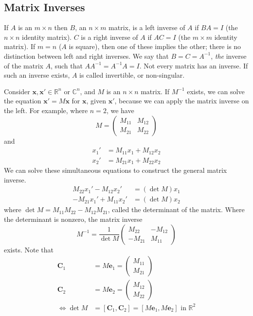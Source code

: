 \documentclass{article}
\begin{document}
\subsection{Matrix Inverses}
If $A$ is an $m \times n$ then $B$, an $n \times m$ matrix, is a left inverse of $A$ if $BA = I$ (the $n \times n$ identity matrix). $C$ is a right inverse of $A$ if $AC = I$ (the $m \times m$ identity matrix). If $m = n$ ($A$ is square), then one of these implies the other; there is no distinction between left and right inverses. We say that $B = C = A^{-1}$, \textit{the} inverse of the matrix $A$, such that $AA^{-1} = A^{-1}A = I$. Not every matrix has an inverse. If such an inverse exists, $A$ is called invertible, or non-singular.

Consider $\bm x, \bm x' \in \mathbb R^n$ or $\mathbb C^n$, and $M$ is an $n \times n$ matrix. If $M^{-1}$ exists, we can solve the equation $\bm x' = M \bm x$ for $\bm x$, given $\bm x'$, because we can apply the matrix inverse on the left. For example, where $n=2$, we have
\[ M = \begin{pmatrix}
		M_{11} & M_{12} \\
		M_{21} & M_{22}
	\end{pmatrix} \]
and
\begin{align*}
	x_1' & = M_{11}x_1 + M_{12}x_2 \\
	x_2' & = M_{21}x_1 + M_{22}x_2
\end{align*}
We can solve these simultaneous equations to construct the general matrix inverse.
\begin{align*}
	M_{22} x_1' - M_{12}x_2'  & = (\det M)x_1 \\
	-M_{21} x_1' + M_{11}x_2' & = (\det M)x_2
\end{align*}
where $\det M = M_{11} M_{22} - M_{12} M_{21}$, called the determinant of the matrix. Where the determinant is nonzero, the matrix inverse
\[ M^{-1} = \frac{1}{\det M}\begin{pmatrix}
		M_{22}  & -M_{12} \\
		-M_{21} & M_{11}
	\end{pmatrix} \]
exists. Note that
\begin{align*}
	\bm C_1     & = M \bm e_1 = \begin{pmatrix} M_{11} \\ M_{21} \end{pmatrix}                            \\
	\bm C_2     & = M \bm e_2 = \begin{pmatrix} M_{12} \\ M_{22} \end{pmatrix}                            \\
	\iff \det M & = [\bm C_1, \bm C_2] = [M\bm e_1, M\bm e_2] \text{ in } \mathbb R^2
\end{align*}
\end{document}
